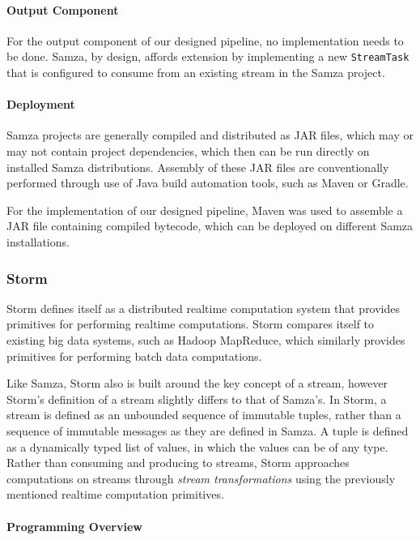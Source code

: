 \paragraph{Output Component}

For the output component of our designed pipeline, no implementation needs to be done. Samza, by design, affords extension
by implementing a new \texttt{StreamTask} that is configured to consume from an existing stream in the Samza project.

\paragraph{Deployment}

Samza projects are generally compiled and distributed as JAR files, which may or may not contain project dependencies,
which then can be run directly on installed Samza distributions. Assembly of these JAR files are conventionally performed
through use of Java build automation tools, such as Maven or Gradle.

For the implementation of our designed pipeline, Maven was used to assemble a JAR file containing compiled bytecode, which can be deployed on different
Samza installations.



\subsubsection{Storm} %
\label{ssub:impl_storm}

Storm defines itself as a distributed realtime computation system that provides primitives for performing realtime
computations. Storm compares itself to existing big data systems, such as Hadoop MapReduce, which similarly provides
primitives for performing batch data computations.

Like Samza, Storm also is built around the key concept of a stream, however Storm's definition of a stream slightly
differs to that of Samza's. In Storm, a stream is defined as an unbounded sequence of immutable tuples, rather than a sequence
of immutable messages as they are defined in Samza. A tuple is defined as a dynamically typed list of values, in which
the values can be of any type. Rather than consuming and producing to streams, Storm approaches computations on streams
through \textit{stream transformations} using the previously mentioned realtime computation primitives.

\paragraph{Programming Overview}

